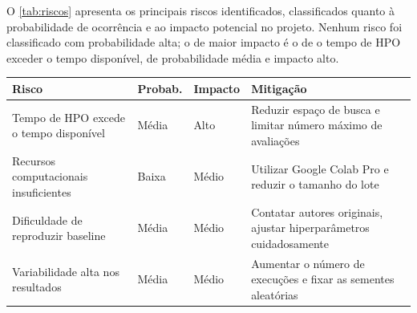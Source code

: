 O \autoref{tab:riscos} apresenta os principais riscos identificados, classificados quanto à probabilidade de ocorrência e ao impacto potencial no projeto. Nenhum risco foi classificado com probabilidade alta; o de maior impacto é o de o tempo de HPO exceder o tempo disponível, de probabilidade média e impacto alto.

\begin{quadro}[H]
    \centering
    \caption{Análise de riscos}
    \begin{tabular}{|p{}|p{}|p{}|p{}|}
        \hline
        \rowcolor[HTML]{C0C0C0}
        \textbf{Risco} & \textbf{Probab.} & \textbf{Impacto} & \textbf{Mitigação} \\
        \hline

        Tempo de HPO excede o tempo disponível & Média & Alto & Reduzir espaço de busca e limitar número máximo de avaliações \\
        \hline

        Recursos computacionais insuficientes & Baixa & Médio & Utilizar Google Colab Pro e reduzir o tamanho do lote \\
        \hline

        Dificuldade de reproduzir baseline & Média & Médio & Contatar autores originais, ajustar hiperparâmetros cuidadosamente \\
        \hline

        Variabilidade alta nos resultados & Média & Médio & Aumentar o número de execuções e fixar as sementes aleatórias \\
        \hline
    \end{tabular}
    \label{tab:riscos}
\end{quadro}
